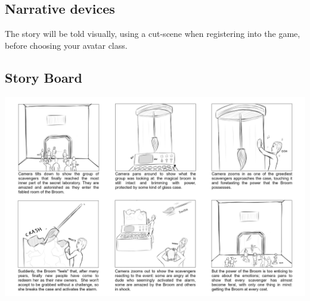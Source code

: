 \subsection{Narrative devices}

The story will be told visually, using a cut-scene when registering into the game, before choosing your avatar class.\\

\pagebreak

\subsection{Story Board}

\includegraphics[height=\textwidth, angle=-90, origin=c]{../Pictures/Concept/Storyboard.png}
